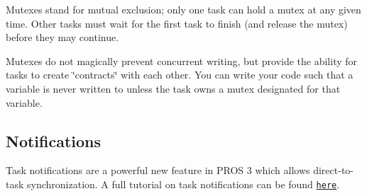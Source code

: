 Mutexes stand for mutual exclusion; only one task can hold a mutex at any given time. Other tasks must wait for the first task to finish (and release the mutex) before they may continue.

Mutexes do not magically prevent concurrent writing, but provide the ability for tasks to create \char`\"{}contracts\char`\"{} with each other. You can write your code such that a variable is never written to unless the task owns a mutex designated for that variable.

\subsection*{Notifications}

Task notifications are a powerful new feature in P\+R\+OS 3 which allows direct-\/to-\/task synchronization. A full tutorial on task notifications can be found \href{./notifications.html}{\tt here}. 